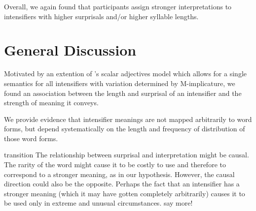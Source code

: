 \documentclass[10pt,letterpaper]{article}
\newcommand{\w}[1]{\emph{#1}}
\newcommand{\todo}[1]{{\color{red}#1}}
\begin{document}
Overall, we again found that participants assign stronger interpretations to intensifiers with higher surprisals and/or higher syllable lengths.

\section{General Discussion}

Motivated by an extention of 's scalar adjectives model which allows for a single semantics for all intensifiers with variation determined by M-implicature, we found an association between the length and surprisal of an intensifier and the strength of meaning it conveys.

We provide evidence that intensifier meanings are not mapped arbitrarily to word forms, but depend systematically on the length and frequency of distribution of those word forms.

%

\todo{transition}
The relationship between surprisal and interpretation \todo{might} be causal. The rarity of the word \todo{might} cause it to be costly to use and therefore to correspond to a stronger meaning, as in our hypothesis.
However, the causal direction could also be the opposite.
Perhaps the fact that an intensifier has a stronger meaning (which it may have gotten completely arbitrarily) causes it to be used only in extreme and unusual circumstances.
\todo{say more!}

\end{document}
